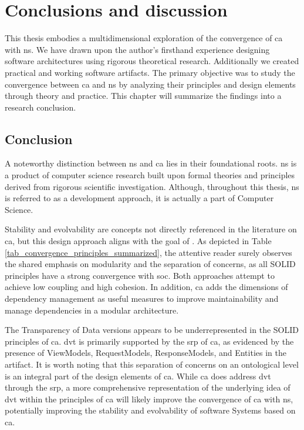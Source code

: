 \chapter{Conclusions and discussion} \label{chap_conclusions}

This thesis embodies a multidimensional exploration of the convergence of \gls{ca} with
\gls{ns}. We have drawn upon the author's firsthand experience designing software
architectures using rigorous theoretical research. Additionally we created practical and
working software artifacts. The primary objective was to study the convergence between
\gls{ca} and \gls{ns} by analyzing their principles and design elements through theory
and practice. This chapter will summarize the findings into a research conclusion.

\section{Conclusion}

A noteworthy distinction between \gls{ns} and \gls{ca} lies in their foundational roots.
\gls{ns} is a product of computer science research built upon formal theories and
principles derived from rigorous scientific investigation. Although, throughout this
thesis, \gls{ns} is referred to as a development approach, it is actually a part of
Computer Science.

Stability and evolvability are concepts not directly referenced in the literature on
\gls{ca}, but this design approach aligns with the goal of
\textcite[31]{mannaert_normalized_2016}. As depicted in Table
\ref{tab_convergence_principles_summarized}, the attentive reader surely observes the
shared emphasis on modularity and the separation of concerns, as all SOLID principles have
a strong convergence with \gls{soc}. Both approaches attempt to achieve low coupling and
high cohesion. In addition, \gls{ca} adds the dimensions of dependency management as
useful measures to improve maintainability and manage dependencies in a modular
architecture.

The Transparency of Data versions appears to be underrepresented in the SOLID principles
of \gls{ca}. \gls{dvt} is primarily supported by the \gls{srp} of \gls{ca}, as evidenced
by the presence of ViewModels, RequestModels, ResponseModels, and Entities in the
artifact. It is worth noting that this separation of concerns on an ontological level is an
integral part of the design elements of \gls{ca}. While \gls{ca} does address \gls{dvt}
through the \gls{srp}, a more comprehensive representation of the underlying idea of
\gls{dvt} within the principles of \gls{ca} will likely improve the convergence of
\gls{ca} with \gls{ns}, potentially improving the stability and evolvability of software
Systems based on \gls{ca}.

